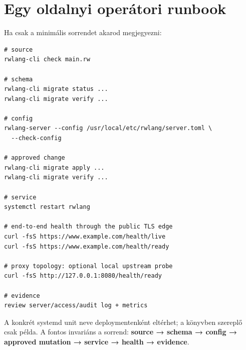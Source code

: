 \section{Egy oldalnyi operátori runbook}

Ha csak a minimális sorrendet akarod megjegyezni:

\begin{lstlisting}
# source
rwlang-cli check main.rw

# schema
rwlang-cli migrate status ...
rwlang-cli migrate verify ...

# config
rwlang-server --config /usr/local/etc/rwlang/server.toml \
  --check-config

# approved change
rwlang-cli migrate apply ...
rwlang-cli migrate verify ...

# service
systemctl restart rwlang

# end-to-end health through the public TLS edge
curl -fsS https://www.example.com/health/live
curl -fsS https://www.example.com/health/ready

# proxy topology: optional local upstream probe
curl -fsS http://127.0.0.1:8080/health/ready

# evidence
review server/access/audit log + metrics
\end{lstlisting}

A konkrét systemd unit neve deploymentenként eltérhet; a könyvben szereplő  csak példa. A fontos invariáns a sorrend: \textbf{source → schema → config → approved mutation → service → health → evidence}.
